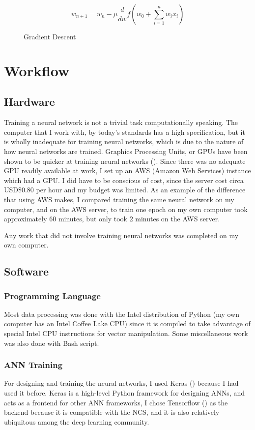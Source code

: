           \begin{figure}[h]
            \[
                w_{n+1}=w_n-\mu \frac{d}{dw}f(w_0+\sum_{i=1}^nw_ix_i)
            \]
            \caption{Gradient Descent}
            \label{fig:gradientdescent}
            \end{figure}

\section{Workflow}
    \subsection{Hardware}
    Training a neural network is not a trivial task computationally speaking. The computer that I work with, by today's standards has a high specification, but it is wholly inadequate for training neural networks, which is due to the nature of how neural networks are trained. Graphics Processing Units, or GPUs have been shown to be quicker at training neural networks (\cite{OH20041311}). Since there was no adequate GPU readily available at work, I set up an AWS (Amazon Web Services) instance which had a GPU. I did have to be conscious of cost, since the server cost circa USD\$0.80 per hour and my budget was limited. As an example of the difference that using AWS makes, I compared training the same neural network on my computer, and on the AWS server, to train one epoch on my own computer took approximately 60 minutes, but only took 2 minutes on the AWS server.

    Any work that did not involve training neural networks was completed on my own computer.

    \subsection{Software}
        \subsubsection{Programming Language}
        Most data processing was done with the Intel distribution of Python (my own computer has an Intel Coffee Lake CPU) since it is compiled to take advantage of special Intel CPU instructions for vector manipulation. Some miscellaneous work was also done with Bash script.

        \subsubsection{ANN Training}
        For designing and training the neural networks, I used Keras (\cite{chollet2015keras}) because I had used it before. Keras is a high-level Python framework for designing ANNs, and acts as a frontend for other ANN frameworks, I chose Tensorflow (\cite{tensorflow2015-whitepaper}) as the backend because it is compatible with the NCS, and it is also relatively ubiquitous among the deep learning community.


